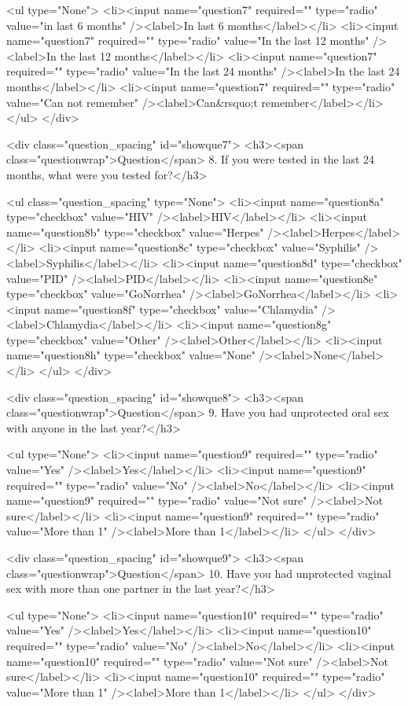 {{{{{<ul type="None">
    <li><input name="question7" required="" type="radio" value="in last 6 months" /><label>In last 6 months</label></li>
    <li><input name="question7" required="" type="radio" value="In the last 12 months" /><label>In the last 12 months</label></li>
    <li><input name="question7" required="" type="radio" value="In the last 24 months" /><label>In the last 24 months</label></li>
    <li><input name="question7" required="" type="radio" value="Can not remember" /><label>Can&rsquo;t remember</label></li>
</ul>
</div>

<div class="question_spacing" id="showque7">
<h3><span class="questionwrap">Question</span> 8. If you were tested in the last 24 months, what were you tested for?</h3>

<ul class="question_spacing" type="None">
    <li><input name="question8a" type="checkbox" value="HIV" /><label>HIV</label></li>
    <li><input name="question8b" type="checkbox" value="Herpes" /><label>Herpes</label></li>
    <li><input name="question8c" type="checkbox" value="Syphilis" /><label>Syphilis</label></li>
    <li><input name="question8d" type="checkbox" value="PID" /><label>PID</label></li>
    <li><input name="question8e" type="checkbox" value="GoNorrhea" /><label>GoNorrhea</label></li>
    <li><input name="question8f" type="checkbox" value="Chlamydia" /><label>Chlamydia</label></li>
    <li><input name="question8g" type="checkbox" value="Other" /><label>Other</label></li>
    <li><input name="question8h" type="checkbox" value="None" /><label>None</label></li>
</ul>
</div>

<div class="question_spacing" id="showque8">
<h3><span class="questionwrap">Question</span> 9. Have you had unprotected oral sex with anyone in the last year?</h3>

<ul type="None">
    <li><input name="question9" required="" type="radio" value="Yes" /><label>Yes</label></li>
    <li><input name="question9" required="" type="radio" value="No" /><label>No</label></li>
    <li><input name="question9" required="" type="radio" value="Not sure" /><label>Not sure</label></li>
    <li><input name="question9" required="" type="radio" value="More than 1" /><label>More than 1</label></li>
</ul>
</div>

<div class="question_spacing" id="showque9">
<h3><span class="questionwrap">Question</span> 10. Have you had unprotected vaginal sex with more than one partner in the last year?</h3>

<ul type="None">
    <li><input name="question10" required="" type="radio" value="Yes" /><label>Yes</label></li>
    <li><input name="question10" required="" type="radio" value="No" /><label>No</label></li>
    <li><input name="question10" required="" type="radio" value="Not sure" /><label>Not sure</label></li>
    <li><input name="question10" required="" type="radio" value="More than 1" /><label>More than 1</label></li>
</ul>
</div>

}}}}}
